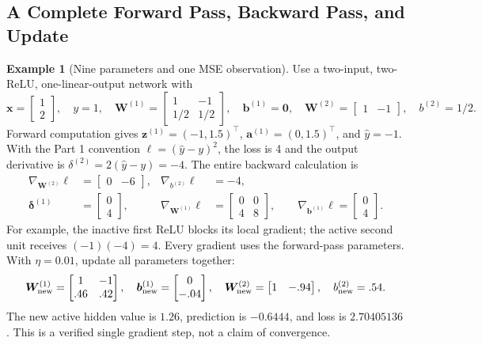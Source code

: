 \documentclass[11pt,twoside]{article}
\numberwithin{equation}{section}
\newcommand{\vect}[1]{\bm{#1}}
\newcommand{\mat}[1]{\bm{#1}}
\theoremstyle{plain}
\theoremstyle{definition}
\newtheorem{example}[theorem]{Example}
\theoremstyle{remark}
\begin{document}
\subsection{A Complete Forward Pass, Backward Pass, and Update}
\label{sec:mlp-worked}
\begin{example}[Nine parameters and one MSE observation]
Use a two-input, two-ReLU, one-linear-output network with
\[
\vect x=\begin{bmatrix}1\\2\end{bmatrix},\quad y=1,\quad
\mat W^{(1)}=\begin{bmatrix}1&-1\\1/2&1/2\end{bmatrix},\quad
\vect b^{(1)}=\vect0,\quad
\mat W^{(2)}=\begin{bmatrix}1&-1\end{bmatrix},\quad b^{(2)}=1/2.
\]
Forward computation gives $\vect z^{(1)}=(-1,1.5)^\top$, $\vect a^{(1)}=(0,1.5)^\top$, and $\hat y=-1$. With the Part 1 convention $\ell=(\hat y-y)^2$, the loss is 4 and the output derivative is $\delta^{(2)}=2(\hat y-y)=-4$. The entire backward calculation is
\begin{align*}
\nabla_{\mat W^{(2)}}\ell&=\begin{bmatrix}0&-6\end{bmatrix},&
\nabla_{b^{(2)}}\ell&=-4,\\
\vect\delta^{(1)}&=\begin{bmatrix}0\\4\end{bmatrix},&
\nabla_{\mat W^{(1)}}\ell&=\begin{bmatrix}0&0\\4&8\end{bmatrix},\qquad
\nabla_{\vect b^{(1)}}\ell=\begin{bmatrix}0\\4\end{bmatrix}.
\end{align*}
For example, the inactive first ReLU blocks its local gradient; the active second unit receives $(-1)(-4)=4$. Every gradient uses the forward-pass parameters. With $\eta=0.01$, update all parameters together:
\[
\mat W^{(1)}_{\rm new}=\begin{bmatrix}1&-1\\.46&.42\end{bmatrix},\quad
\vect b^{(1)}_{\rm new}=\begin{bmatrix}0\\-.04\end{bmatrix},\quad
\mat W^{(2)}_{\rm new}=\begin{bmatrix}1&-.94\end{bmatrix},\quad b^{(2)}_{\rm new}=.54.
\]
The new active hidden value is $1.26$, prediction is $-0.6444$, and loss is $2.70405136$. This is a verified single gradient step, not a claim of convergence.
\end{example}
\end{document}
